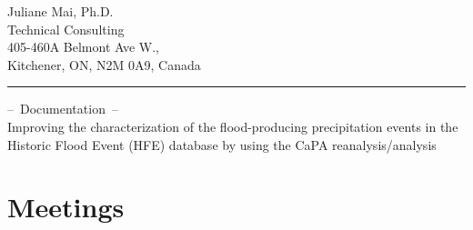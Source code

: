 \documentclass[10pt,a4paper,titlepage,parskip]{scrartcl}
\begin{document}
  
	
	\vspace*{-1cm}
	\pagestyle{fancy}
	
	\begin{center}
		Juliane Mai, Ph.D.\\
		Technical Consulting\\[4pt]
		405-460A Belmont Ave W., \\
		Kitchener, ON, N2M 0A9, Canada\\[10pt]
		{\rule{\linewidth}{0.4pt}}
	\end{center}
	\begin{center}
		\textcolor{myBlue}{{\Large --~Documentation~--}}\\[4pt]
		Improving the characterization of the flood-producing precipitation events in the Historic Flood Event (HFE) database by using the CaPA reanalysis/analysis\\[4pt]
	\end{center}
	

\vspace*{0cm}

\section{Meetings}
\end{document}
